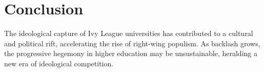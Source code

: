 \documentclass[11pt]{article}
\begin{document}
\section{Conclusion}
The ideological capture of Ivy League universities has contributed to a cultural and political rift, accelerating the rise of right-wing populism. As backlash grows, the progressive hegemony in higher education may be unsustainable, heralding a new era of ideological competition.



\end{document}
